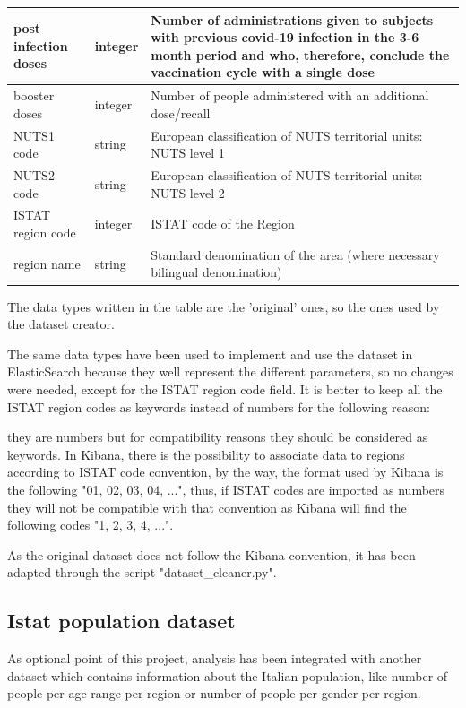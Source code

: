 \documentclass{article}
\begin{document}
\newpage
\begin{center}
\begin{tabular}{ |m{4cm}|m{2cm}|m{4.5cm}|}
\hline
  post infection doses & integer & Number of administrations given to subjects with previous covid-19 infection in the 3-6 month period and who, therefore, conclude the vaccination cycle with a single dose\\ 
    \hline
  booster doses & integer & Number of people administered with an additional dose/recall\\ 
    \hline
  NUTS1 code & string & European classification of NUTS territorial units: NUTS level 1\\ 
    \hline
  NUTS2 code & string & European classification of NUTS territorial units: NUTS level 2\\ 
    \hline
  ISTAT region code & integer & ISTAT code of the Region\\
    \hline
  region name & string & Standard denomination of the area (where necessary bilingual denomination)\\ 
  \hline
  \end{tabular}
\end{center}
\hfill\break
The data types written in the table are the 'original' ones, so the ones used by the dataset creator. 

The same data types have been used to implement and use the dataset in ElasticSearch because they well represent the different parameters, so no changes were needed, except for the ISTAT region code field.
It is better to keep all the ISTAT region codes as keywords instead of numbers for the following reason:

they are numbers but for compatibility reasons they should be considered as keywords. In Kibana, there is the possibility to associate data to regions according to ISTAT code convention, by the way, the format used by Kibana is the following "01, 02, 03, 04, ...", thus, if ISTAT codes are imported as numbers they will not be compatible with that convention as Kibana will find the following codes "1, 2, 3, 4, ...".

As the original dataset does not follow the Kibana convention, it has been adapted through the script {\selectfont"dataset\_cleaner.py"}.
\hfill\break
\hfill\break

\newpage
\subsection{Istat population dataset}
As optional point of this project, analysis has been integrated with another dataset which contains information about the Italian population, like number of people per age range per region or number of people per gender per region.
\end{document}
